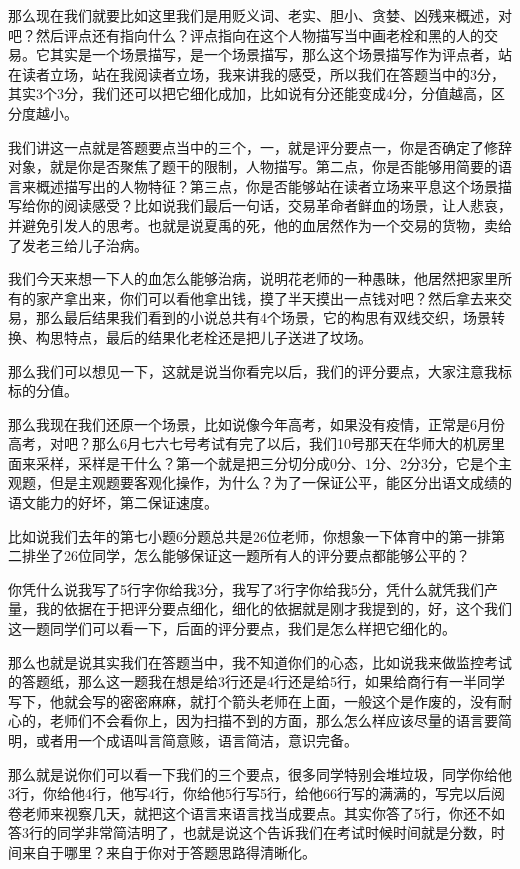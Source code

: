 \documentclass{ctexart}
\renewcommand{\\}{\par}
\begin{document}
那么现在我们就要比如这里我们是用贬义词、老实、胆小、贪婪、凶残来概述，对吧？然后评点还有指向什么？评点指向在这个人物描写当中画老栓和黑的人的交易。它其实是一个场景描写，是一个场景描写，那么这个场景描写作为评点者，站在读者立场，站在我阅读者立场，我来讲我的感受，所以我们在答题当中的3分，其实3个3分，我们还可以把它细化成加，比如说有分还能变成4分，分值越高，区分度越小。

我们讲这一点就是答题要点当中的三个，一，就是评分要点一，你是否确定了修辞对象，就是你是否聚焦了题干的限制，人物描写。第二点，你是否能够用简要的语言来概述描写出的人物特征？第三点，你是否能够站在读者立场来平息这个场景描写给你的阅读感受？比如说我们最后一句话，交易革命者鲜血的场景，让人悲哀，并避免引发人的思考。也就是说夏禹的死，他的血居然作为一个交易的货物，卖给了发老三给儿子治病。

我们今天来想一下人的血怎么能够治病，说明花老师的一种愚昧，他居然把家里所有的家产拿出来，你们可以看他拿出钱，摸了半天摸出一点钱对吧？然后拿去来交易，那么最后结果我们看到的小说总共有4个场景，它的构思有双线交织，场景转换、构思特点，最后的结果化老栓还是把儿子送进了坟场。

那么我们可以想见一下，这就是说当你看完以后，我们的评分要点，大家注意我标标的分值。

那么我现在我们还原一个场景，比如说像今年高考，如果没有疫情，正常是6月份高考，对吧？那么6月七六七号考试有完了以后，我们10号那天在华师大的机房里面来采样，采样是干什么？第一个就是把三分切分成0分、1分、2分3分，它是个主观题，但是主观题要客观化操作，为什么？为了一保证公平，能区分出语文成绩的语文能力的好坏，第二保证速度。

比如说我们去年的第七小题6分题总共是26位老师，你想象一下体育中的第一排第二排坐了26位同学，怎么能够保证这一题所有人的评分要点都能够公平的？

你凭什么说我写了5行字你给我3分，我写了3行字你给我5分，凭什么就凭我们产量，我的依据在于把评分要点细化，细化的依据就是刚才我提到的，好，这个我们这一题同学们可以看一下，后面的评分要点，我们是怎么样把它细化的。

那么也就是说其实我们在答题当中，我不知道你们的心态，比如说我来做监控考试的答题纸，那么这一题我在想是给3行还是4行还是给5行，如果给商行有一半同学写下，他就会写的密密麻麻，就打个箭头老师在上面，一般这个是作废的，没有耐心的，老师们不会看你上，因为扫描不到的方面，那么怎么样应该尽量的语言要简明，或者用一个成语叫言简意赅，语言简洁，意识完备。

那么就是说你们可以看一下我们的三个要点，很多同学特别会堆垃圾，同学你给他3行，你给他4行，他写4行，你给他5行写5行，给他66行写的满满的，写完以后阅卷老师来视察几天，就把这个语言来语言找当成要点。其实你答了5行，你还不如答3行的同学非常简洁明了，也就是说这个告诉我们在考试时候时间就是分数，时间来自于哪里？来自于你对于答题思路得清晰化。
\end{document}
